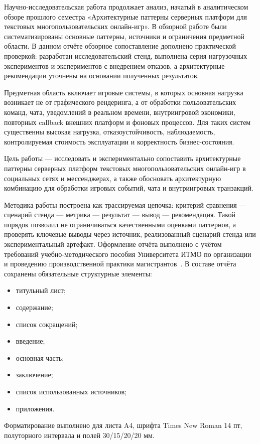 \documentclass[a4paper,14pt]{extarticle}
\numberwithin{figure}{section}
\numberwithin{table}{section}
\begin{document}
Научно-исследовательская работа продолжает анализ, начатый в аналитическом обзоре прошлого семестра «Архитектурные паттерны серверных платформ для текстовых многопользовательских онлайн-игр». В обзорной работе были систематизированы основные паттерны, источники и ограничения предметной области. В данном отчёте обзорное сопоставление дополнено практической проверкой: разработан исследовательский стенд, выполнена серия нагрузочных экспериментов и экспериментов с внедрением отказов, а архитектурные рекомендации уточнены на основании полученных результатов.

Предметная область включает игровые системы, в которых основная нагрузка возникает не от графического рендеринга, а от обработки пользовательских команд, чата, уведомлений в реальном времени, внутриигровой экономики, повторных callback внешних платформ и фоновых процессов. Для таких систем существенны высокая нагрузка, отказоустойчивость, наблюдаемость, контролируемая стоимость эксплуатации и корректность бизнес-состояния.

Цель работы --- исследовать и экспериментально сопоставить архитектурные паттерны серверных платформ текстовых многопользовательских онлайн-игр в социальных сетях и мессенджерах, а также обосновать архитектурную комбинацию для обработки игровых событий, чата и внутриигровых транзакций.

Методика работы построена как трассируемая цепочка: критерий сравнения --- сценарий стенда --- метрика --- результат --- вывод --- рекомендация. Такой порядок позволил не ограничиваться качественными оценками паттернов, а проверять ключевые выводы через источник, реализованный сценарий стенда или экспериментальный артефакт. Оформление отчёта выполнено с учётом требований учебно-методического пособия Университета ИТМО по организации и проведению производственной практики магистрантов~\cite{markina2020practice}. В составе отчёта сохранены обязательные структурные элементы:
\begin{itemize}
\item титульный лист;
\item содержание;
\item список сокращений;
\item введение;
\item основная часть;
\item заключение;
\item список использованных источников;
\item приложения.
\end{itemize}
Форматирование выполнено для листа A4, шрифта Times New Roman 14 пт, полуторного интервала и полей 30/15/20/20 мм.
\end{document}
